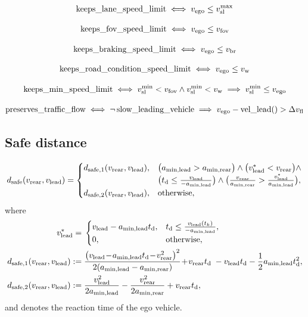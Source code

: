 \begin{align}
\operatorname*{keeps\_lane\_speed\_limit} \iff v_\text{ego} \leq v_\text{sl}^\text{max}
\end{align}

\begin{align}
\operatorname*{keeps\_fov\_speed\_limit} \iff v_\text{ego} \leq v_\text{fov}
\end{align}

\begin{align}
\operatorname*{keeps\_braking\_speed\_limit} \iff v_\text{ego} \leq v_\text{br}
\end{align}

\begin{align}
\operatorname*{keeps\_road\_condition\_speed\_limit} \iff v_\text{ego} \leq v_\text{w}
\end{align}


\begin{align}
\operatorname*{keeps\_min\_speed\_limit} \iff v_\text{sl}^\text{min} < v_\text{fov} \land v_\text{sl}^\text{min} < v_\text{w}  \implies v_\text{sl}^\text{min} \leq v_\text{ego}
\end{align}

\begin{align}
\operatorname*{preserves\_traffic\_flow} \iff \neg \operatorname*{slow\_leading\_vehicle} \implies v_\text{ego} - \operatorname*{vel\_lead}() > \Delta v_\text{fl}
\end{align}

\subsection{Safe distance}

\begin{equation*} 
d_\text{safe}(v_\text{rear}, v_\text{lead}) =
\begin{cases}
d_{\text{safe},1}(v_\text{rear}, v_\text{lead}), & \big(a_\text{min,lead} > a_\text{min,rear} \big) \land \big(v_\text{lead}^\ast < v_\text{rear} \big) \land \\
& \big(t_\text{d} \leq \frac{v_\text{lead}}{-a_\text{min,lead}}\big) \land \big(\frac{v_\text{rear}}{a_\text{min,rear}} > \frac{v_\text{lead}^\ast}{a_\text{min,lead}}\big), \\
d_{\text{safe},2}(v_\text{rear}, v_\text{lead}), & \text{otherwise},
\end{cases}
\end{equation*}
where
\allowdisplaybreaks
\begin{align*}
v_\text{lead}^\ast = & \; \begin{cases}
v_\text{lead} - a_\text{min,lead} t_\text{d}, & t_\text{d} \leq \frac{v_\text{lead}(t_k)}{-a_\text{min,lead}}, \\
0, & \text{otherwise}, 
\end{cases} \\
d_{\text{safe},1}(v_\text{rear}, v_\text{lead}) := & \; \frac{\big(v_\text{lead} \! - \! a_\text{min,lead} t_\text{d} \! - \! v_\text{rear}^2\big)^2}{2 (a_\text{min,lead} - a_\text{min,rear})} \! + \! v_\text{rear} t_\text{d} \; - v_\text{lead} t_\text{d} - \frac{1}{2} a_\text{min,lead} t_\text{d}^2 , \\
d_{\text{safe},2}(v_\text{rear}, v_\text{lead}) := & \; \frac{v_\text{lead}^2}{2 a_\text{min,lead}} - \frac{v_\text{rear}^2}{2 a_\text{min,rear}} + v_\text{rear} t_\text{d} ,  \\
\end{align*} 
and \timeDelay denotes the reaction time of the ego vehicle.


